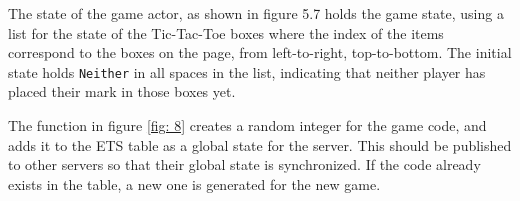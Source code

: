\documentclass[]{final}
\begin{document}
\newpage

\begin{minipage}[t]{18em}
  The state of the game actor, as shown in figure 5.7
  holds the game state, using a list for the state of the Tic-Tac-Toe boxes
  where the index of the items correspond to the boxes on the page, from
  left-to-right, top-to-bottom. The initial state holds \lstinline|Neither| in
  all spaces in the list, indicating that neither player has placed
  their mark in those boxes yet.

  \vspace*{10em}

  The function in figure \ref{fig: 8} creates a random integer for the game code,
  and adds it to the ETS table as a global state for the server. This should be
  published to other servers so that their global state is synchronized. If the
  code already exists in the table, a new one is generated for the new game.
\end{minipage}
\hfill
\end{document}
